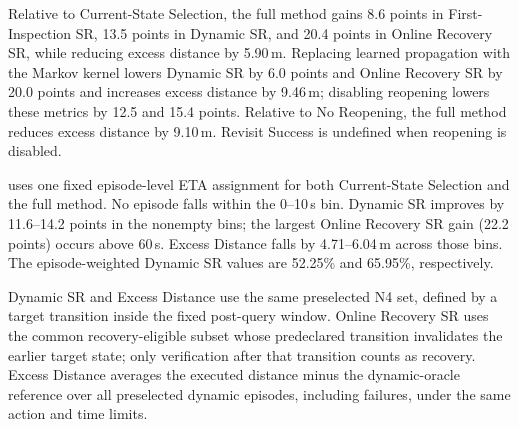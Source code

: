Relative to Current-State Selection, the full method gains 8.6 points in
First-Inspection SR, 13.5 points in Dynamic SR, and 20.4 points in Online
Recovery SR, while reducing excess distance by 5.90\,m. Replacing learned
propagation with the Markov kernel lowers Dynamic SR by 6.0 points and
Online Recovery SR by 20.0 points and increases excess distance by 9.46\,m;
disabling reopening lowers these metrics
by 12.5 and 15.4 points. Relative to No Reopening, the full method reduces
excess distance by 9.10\,m. Revisit Success is undefined when reopening is disabled.

 uses one fixed episode-level ETA assignment for
both Current-State Selection and the full method. No episode falls within
the 0--10\,s bin. Dynamic SR improves by 11.6--14.2 points in the
nonempty bins; the largest Online Recovery SR gain (22.2 points) occurs
above 60\,s. Excess Distance falls by 4.71--6.04\,m across those bins.
The episode-weighted Dynamic SR values are 52.25\% and
65.95\%, respectively.

\begin{table}[!t]
\caption{Arrival-time analysis on the shared N4 dynamic episodes. SR columns
are percentages; Excess columns are meters relative to the shortest
time-feasible dynamic-oracle route. The bin is fixed per episode for both
variants.}
\label{tab:eta-mechanisms}
\centering
\scriptsize
\setlength{\tabcolsep}{4pt}
\end{table}

Dynamic SR and Excess Distance use the same preselected N4 set, defined by a
target transition inside the fixed post-query window. Online Recovery SR
uses the common recovery-eligible subset whose predeclared transition
invalidates the earlier target state; only verification after that transition
counts as recovery. Excess Distance averages the executed distance minus
the dynamic-oracle reference over all preselected dynamic episodes, including
failures, under the same action and time limits.

